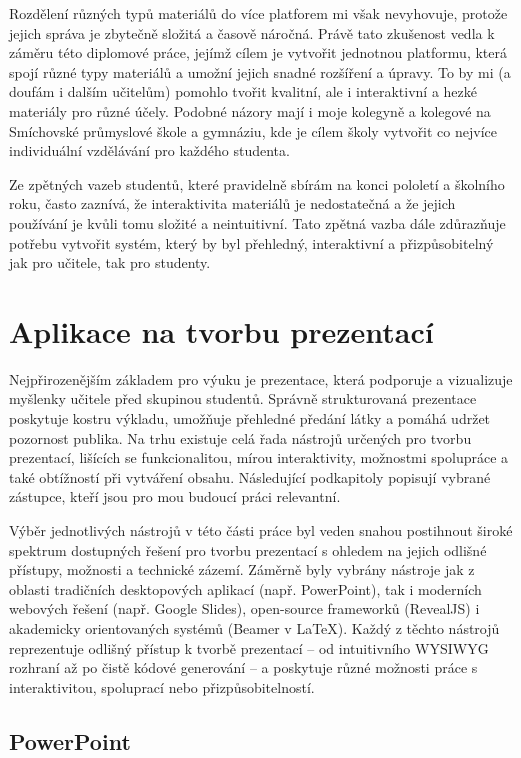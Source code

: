 Rozdělení různých typů materiálů do více platforem mi však nevyhovuje, protože jejich správa je zbytečně složitá a časově náročná.
Právě tato zkušenost vedla k záměru této diplomové práce, jejímž cílem je vytvořit jednotnou platformu, která spojí různé typy materiálů a umožní jejich snadné rozšíření a úpravy.
To by mi (a doufám i dalším učitelům) pomohlo tvořit kvalitní, ale i interaktivní a hezké materiály pro různé účely.
Podobné názory mají i moje kolegyně a kolegové na Smíchovské průmyslové škole a gymnáziu, kde je cílem školy vytvořit co nejvíce individuální vzdělávání pro každého studenta.

Ze zpětných vazeb studentů, které pravidelně sbírám na konci pololetí a školního roku, často zaznívá, že interaktivita materiálů je nedostatečná a že jejich používání je kvůli tomu složité a neintuitivní.
Tato zpětná vazba dále zdůrazňuje potřebu vytvořit systém, který by byl přehledný, interaktivní a přizpůsobitelný jak pro učitele, tak pro studenty.

\section{Aplikace na tvorbu prezentací}\label{text:analyza/prezentace}

Nejpřirozenějším základem pro výuku je prezentace, která podporuje a vizualizuje myšlenky učitele před skupinou studentů.
Správně strukturovaná prezentace poskytuje kostru výkladu, umožňuje přehledné předání látky a pomáhá udržet pozornost publika.
Na trhu existuje celá řada nástrojů určených pro tvorbu prezentací, lišících se funkcionalitou, mírou interaktivity, možnostmi spolupráce a také obtížností při vytváření obsahu.
Následující podkapitoly popisují vybrané zástupce, kteří jsou pro mou budoucí práci relevantní.

Výběr jednotlivých nástrojů v této části práce byl veden snahou postihnout široké spektrum dostupných řešení pro tvorbu prezentací s ohledem na jejich odlišné přístupy, možnosti a technické zázemí. 
Záměrně byly vybrány nástroje jak z oblasti tradičních desktopových aplikací (např. PowerPoint), tak i moderních webových řešení (např. Google Slides), open-source frameworků (RevealJS) i akademicky orientovaných systémů (Beamer v \LaTeX). 
Každý z těchto nástrojů reprezentuje odlišný přístup k tvorbě prezentací -- od intuitivního WYSIWYG rozhraní až po čistě kódové generování -- a poskytuje různé možnosti práce s interaktivitou, spoluprací nebo přizpůsobitelností.

\subsection{PowerPoint}

